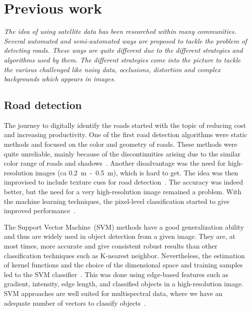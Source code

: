 \chapter{Previous work}\label{chapt:previous}
\textit{The idea of using satellite data has been researched within many communities. Several automated and semi-automated ways are proposed to tackle the problem of detecting roads. These ways are quite different due to the different strategies and algorithms used by them. The different strategies come into the picture to tackle the various challenged like noisy data, occlusions, distortion and complex backgrounds which appears in images.}

\section{Road detection}
The journey to digitally identify the roads started with the topic of reducing cost and increasing productivity. One of the first road detection algorithms were static methods and focused on the color and geometry of roads. These methods were quite unreliable, mainly because of the discontinuities arising due to the similar color range of roads and shadows~\cite{Detecting_interections_using_color,Detecting_roads_using_color}. Another disadvantage was the need for high-resolution images (ca 0.2~m~-~0.5~m), which is hard to get. The idea was then improvised to include texture cues for road detection~\cite{using_texture_for_road_detection,baumgartner1999automatic}. The accuracy was indeed better, but the need for a very high-resolution image remained a problem. With the machine learning techniques, the pixel-level classification started to give improved performance~\cite{road_detection_using_neural_nets_SVM,road_detection_using_env_learning,road_detection_using_SVM_online_learning}.

The Support Vector Machine~(SVM) methods have a good generalization ability and thus are widely used in object detection from a given image. They are, at most times, more accurate and give consistent robust results than other classification techniques such as K-nearest neighbor. Nevertheless, the estimation of kernel functions and the choice of the dimensional space and training samples led to the SVM classifier~\cite{YagerSowmya2003,melgani2004classification}. This was done using edge-based features such as gradient, intensity, edge length, and classified objects in a high-resolution image. SVM approaches are well suited for multispectral data, where we have an adequate number of vectors to classify objects~\cite{Simler2011}.

